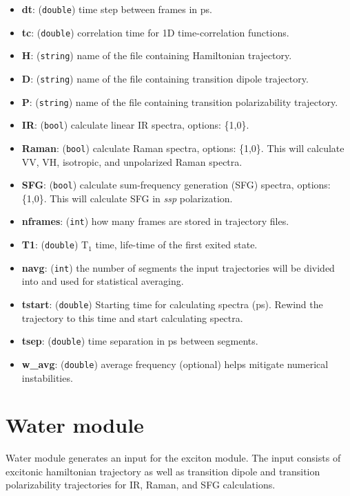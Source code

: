 \documentclass{article}
\begin{document}
\begin{itemize}
\item \textbf{dt}: (\texttt{double}) time step between frames in ps.
\item \textbf{tc}: (\texttt{double}) correlation time for 1D time-correlation functions.
\item \textbf{H}: (\texttt{string}) name of the file containing Hamiltonian trajectory. 
\item \textbf{D}: (\texttt{string}) name of the file containing transition dipole trajectory. 
\item \textbf{P}: (\texttt{string}) name of the file containing transition polarizability trajectory. 
\item \textbf{IR}: (\texttt{bool}) calculate linear IR spectra, options: \{1,0\}.
\item \textbf{Raman}: (\texttt{bool}) calculate Raman spectra, options: \{1,0\}. This will calculate VV, VH, isotropic, and unpolarized Raman spectra.
\item \textbf{SFG}: (\texttt{bool}) calculate sum-frequency generation (SFG) spectra, options: \{1,0\}. This will calculate SFG in \textit{ssp} polarization.
\item \textbf{nframes}: (\texttt{int}) how many frames are stored in trajectory files.
\item \textbf{T1}: (\texttt{double}) T$_1$ time, life-time of the first exited state.
\item \textbf{navg}: (\texttt{int}) the number of segments the input trajectories will be divided into and used for statistical averaging.
\item \textbf{tstart}: (\texttt{double}) Starting time for calculating spectra (ps). Rewind the trajectory to this time and start calculating spectra. 
\item \textbf{tsep}: (\texttt{double}) time separation in ps between segments.
\item \textbf{w\_avg}: (\texttt{double}) average frequency (optional) helps mitigate numerical instabilities.

\end{itemize}

\section{Water module}
Water module generates an input for the exciton module. The input consists of excitonic hamiltonian trajectory as well as 
transition dipole and transition polarizability trajectories for IR, Raman, and SFG calculations.
\end{document}
